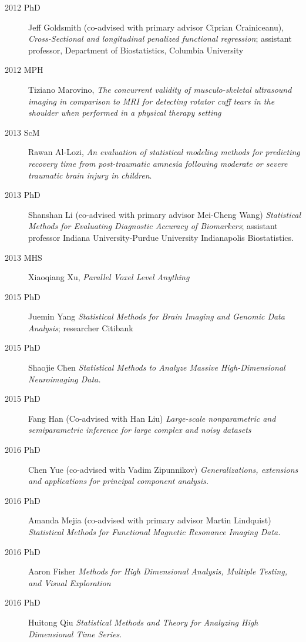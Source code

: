 \documentclass[12pt]{article}
\begin{document}
\begin{description}
\item[\textnormal{2012 PhD}] Jeff Goldsmith (co-advised with primary advisor Ciprian Crainiceanu), {\it Cross-Sectional and longitudinal penalized functional regression}; assistant professor, Department of Biostatistics, Columbia University
\item[\textnormal{2012 MPH}] Tiziano Marovino, {\it The concurrent validity of musculo-skeletal ultrasound imaging in comparison to
MRI for detecting rotator cuff tears in the shoulder when performed in a physical therapy setting}
\item[\textnormal{2013 ScM}] Rawan Al-Lozi, {\it An evaluation of statistical modeling
methods for predicting recovery time from post-traumatic amnesia following moderate or severe traumatic brain injury in children}.
\item[\textnormal{2013 PhD}] Shanshan Li (co-advised with primary advisor Mei-Cheng Wang)
 {\it Statistical Methods for Evaluating Diagnostic Accuracy of Biomarkers}; assistant professor Indiana University-Purdue University  Indianapolis Biostatistics.
\item[\textnormal{2013 MHS}] Xiaoqiang Xu, {\it Parallel Voxel Level Anything}
\item[\textnormal{2015 PhD}] Juemin Yang {\it Statistical Methods for Brain
Imaging and Genomic Data Analysis}; researcher Citibank
\item[\textnormal{2015 PhD}] Shaojie Chen {\it Statistical Methods to Analyze Massive High-Dimensional Neuroimaging Data.}
\item[\textnormal{2015 PhD}] Fang Han (Co-advised with Han Liu) {\it Large-scale nonparametric and semiparametric inference for large complex and noisy datasets}
\item[\textnormal{2016 PhD}] Chen Yue (co-advised with Vadim Zipunnikov) {\it Generalizations, extensions and applications for principal component analysis.}
\item[\textnormal{2016 PhD}] Amanda Mejia (co-advised with primary advisor Martin Lindquist) {\it Statistical Methods for Functional Magnetic Resonance Imaging Data. }
\item[\textnormal{2016 PhD}] Aaron Fisher {\it Methods for High Dimensional Analysis, Multiple Testing, and Visual Exploration }
\item[\textnormal{2016 PhD}] Huitong Qiu {\it Statistical Methods and Theory for  Analyzing High Dimensional Time Series}.
\end{description}
\end{document}
